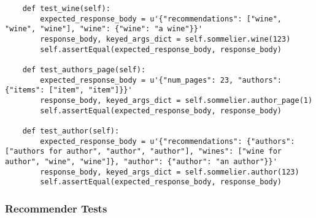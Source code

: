 \begin{verbatim}
    def test_wine(self):
        expected_response_body = u'{"recommendations": ["wine", "wine", "wine"], "wine": {"wine": "a wine"}}'
        response_body, keyed_args_dict = self.sommelier.wine(123)
        self.assertEqual(expected_response_body, response_body)

    def test_authors_page(self):
        expected_response_body = u'{"num_pages": 23, "authors": {"items": ["item", "item"]}}'
        response_body, keyed_args_dict = self.sommelier.author_page(1)
        self.assertEqual(expected_response_body, response_body)

    def test_author(self):
        expected_response_body = u'{"recommendations": {"authors": ["authors for author", "author", "author"], "wines": ["wine for author", "wine", "wine"]}, "author": {"author": "an author"}}'
        response_body, keyed_args_dict = self.sommelier.author(123)
        self.assertEqual(expected_response_body, response_body)

\end{verbatim}

\subsubsection{Recommender Tests}

